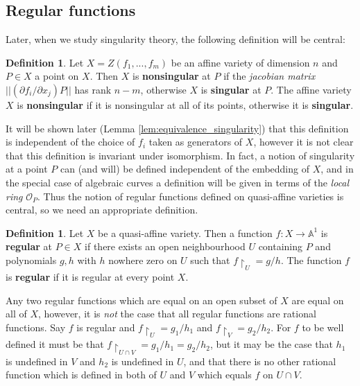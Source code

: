 \documentclass[12pt]{article}
\theoremstyle{plain}
\theoremstyle{definition}
\newtheorem{defn}[thm]{Definition} %
\newcommand{\bb}[1]{\mathbb{#1}}
\newcommand{\call}[1]{\mathcal{#1}}
\newcommand{\lto}{\longrightarrow}
\begin{document}
\subsection{Regular functions}
Later, when we study singularity theory, the following definition will be central:
\begin{defn}
Let $X = Z(f_1,...,f_m)$ be an affine variety of dimension $n$ and $P \in X$ a point on $X$. Then $X$ is \textbf{nonsingular} at $P$ if the \emph{jacobian matrix} $||(\partial f_i/\partial x_j)P ||$ has rank $n - m$, otherwise $X$ is \textbf{singular} at $P$. The affine variety $X$ is \textbf{nonsingular} if it is nonsingular at all of its points, otherwise it is \textbf{singular}.
\end{defn}
It will be shown later (Lemma \ref{lem:equivalence_singularity}) that this definition is independent of the choice of $f_i$ taken as generators of $X$, however it is not clear that this definition is invariant under isomorphism. In fact, a notion of singularity at a point $P$ can (and will) be defined independent of the embedding of $X$, and in the special case of algebraic curves a definition will be given in terms of the \emph{local ring} $\call{O}_P$. Thus the notion of regular functions defined on quasi-affine varieties is central, so we need an appropriate definition.
\begin{defn}
Let $X$ be a quasi-affine variety. Then a function $f: X \lto \bb{A}^1$ is \textbf{regular} at $P \in X$ if there exists an open neighbourhood $U$ containing $P$ and polynomials $g,h$ with $h$ nowhere zero on $U$ such that $f\restriction_U = g/h$. The function $f$ is \textbf{regular} if it is regular at every point $X$.
\end{defn}
Any two regular functions which are equal on an open subset of $X$ are equal on all of $X$, however, it is \emph{not} the case that all regular functions are rational functions. Say $f$ is regular and $f\restriction_U = g_1/h_1$ and $f\restriction_V = g_2/h_2$. For $f$ to be well defined it must be that $f\restriction_{U \cap V} = g_1/h_1 = g_2/h_2$, but it may be the case that $h_1$ is undefined in $V$ and $h_2$ is undefined in $U$, and that there is no other rational function which is defined in both of $U$ and $V$ which equals $f$ on $U \cap V$.
\end{document}
